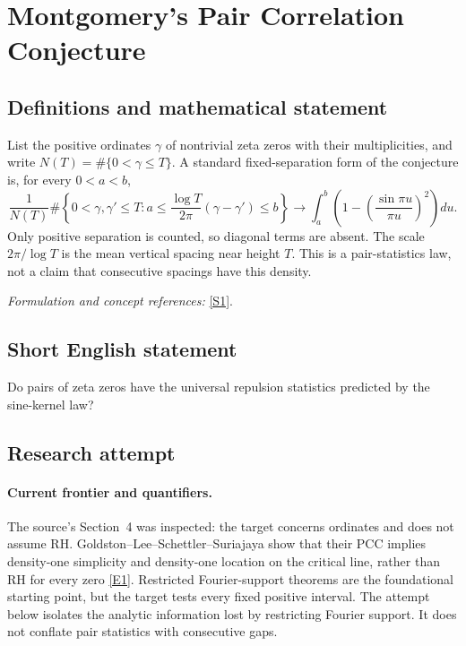 \documentclass[11pt,a4paper]{article}
\numberwithin{equation}{section}
\newcommand{\sref}[2]{\hyperlink{source:#1:#2}{[S#2]}}
\newcommand{\eref}[2]{\hyperlink{extra:#1:#2}{[E#2]}}
\newif\ifshowcatalogue
\newcommand{\cataloguescope}[1]{\ifshowcatalogue
 \paragraph{Exact scope in the supplied catalogue.}
 \begin{quote}\small #1\end{quote}\fi}
\begin{document}
\setcounter{section}{0}
\section*{\texorpdfstring{Montgomery's Pair Correlation Conjecture}{Montgomery's Pair Correlation Conjecture}}\label{1277}
\subsection{Definitions and mathematical statement}
List the positive ordinates $\gamma$ of nontrivial zeta zeros with their multiplicities, and write $N(T)=\#\{0<\gamma\le T\}$. A standard fixed-separation form of the conjecture is, for every $0<a<b$,
\[
 \frac{1}{N(T)}\#\left\{0<\gamma,\gamma'\le T:
 a\le\frac{\log T}{2\pi}(\gamma-\gamma')\le b\right\}
 \longrightarrow\int_a^b\left(1-\left(\frac{\sin\pi u}{\pi u}\right)^2\right)du.
\]
Only positive separation is counted, so diagonal terms are absent. The scale $2\pi/\log T$ is the mean vertical spacing near height $T$. This is a pair-statistics law, not a claim that consecutive spacings have this density.
\par\smallskip\textit{Formulation and concept references:} \sref{1277}{1}.
\cataloguescope{Prove that normalized vertical gaps between pairs of nontrivial zeros of the Riemann zeta function have limiting pair density 1 - (sin(pi u)/(pi u))\textasciicircum{}2 at fixed positive normalized separation.}
\subsection{Short English statement}
Do pairs of zeta zeros have the universal repulsion statistics predicted by the sine-kernel law?
\subsection{Research attempt}

\paragraph{Current frontier and quantifiers.}
The source's Section~4 was inspected: the target concerns ordinates and does
not assume RH. Goldston--Lee--Schettler--Suriajaya show that their PCC
implies density-one simplicity and density-one location on the critical
line, rather than RH for every zero \eref{1277}{1}.
Restricted Fourier-support theorems are the foundational starting point,
but the target tests every fixed positive interval. The attempt below
isolates the analytic information lost by restricting Fourier support.
It does not conflate pair statistics with consecutive gaps.
\end{document}
